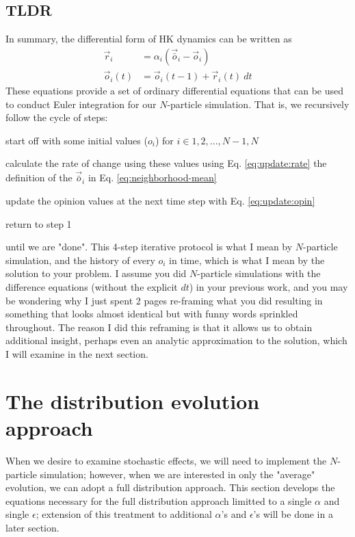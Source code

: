 \documentclass{article}
\begin{document}
\subsection{TLDR}
In summary, the differential form of HK dynamics can be written as
\begin{subequations}\label{eq:update-eqs}
    \begin{align}
        {\vec{r}}_{i} &= \alpha_i ({\vec{\bar{o}}}_i - {\vec{o}}_i)\label{eq:update:rate}\\
        {\vec{o}}_i(t) &= {\vec{o}}_i(t-1) + {\vec{r}}_i(t) ~ dt\label{eq:update:opin}
    \end{align}
\end{subequations} 
These equations provide a set of ordinary differential equations that can be used to conduct Euler integration
for our $N$-particle simulation.  That is, we recursively follow the cycle of steps:
\begin{enumerate}
  {\item start off with some initial values ($o_i$) for $i \in {1, 2, ..., N-1 , N}$}
  {\item calculate the rate of change using these values using Eq. \ref{eq:update:rate}
the definition of the ${\vec{\bar{o}}}_i$ in Eq. \ref{eq:neighborhood-mean}}
  {\item update the opinion values at the next time step with Eq. \ref{eq:update:opin}}
  {\item return to step 1}
\end{enumerate}
until we are "done".  This 4-step iterative protocol is what I mean by $N$-particle
simulation, and the history of every $o_i$ in time, which is what I mean by the solution to your problem.
I assume you did $N$-particle simulations with the difference equations (without the explicit $dt$) in your previous
work,
and you may be wondering why I just spent 2 pages re-framing what you did resulting in something that looks
almost identical but with funny words sprinkled throughout.
The reason I did this reframing is that it allows us to obtain additional insight, perhaps even an analytic
approximation to the solution, which I will examine in the next section.




\section{The distribution evolution approach}
When we desire to examine stochastic effects, we will need to implement the $N$-particle simulation;
however, when we are interested in only the "average" evolution, we can adopt a full distribution approach.
This section develops the equations necessary for the full distribution approach limitted to a single $\alpha$
and single $\epsilon$; extension of this treatment to additional $\alpha$'s and $\epsilon$'s will be
done in a later section.
\end{document}
